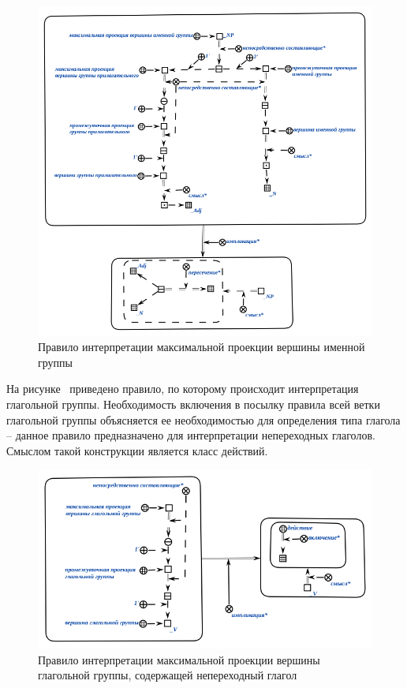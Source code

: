 \begin{figure}[h]
    \centering
    \includegraphics[scale=0.8]{images/part2/chapter_lang/d_sem_2}
    \caption{Правило интерпретации максимальной проекции вершины именной группы}
    \label{fig:d_sem_2}
\end{figure}

На рисунке~\textit{} приведено правило, по которому происходит интерпретация глагольной группы.
Необходимость включения в посылку правила всей ветки глагольной группы объясняется ее необходимостью для определения типа глагола -- данное правило предназначено для интерпретации непереходных глаголов.
Смыслом такой конструкции является класс действий.

\begin{figure}[h]
    \centering
    \includegraphics[scale=0.8]{images/part2/chapter_lang/d_sem_3}
    \caption{Правило интерпретации максимальной проекции вершины глагольной группы, содержащей непереходный глагол}
    \label{fig:d_sem_3}
\end{figure}

